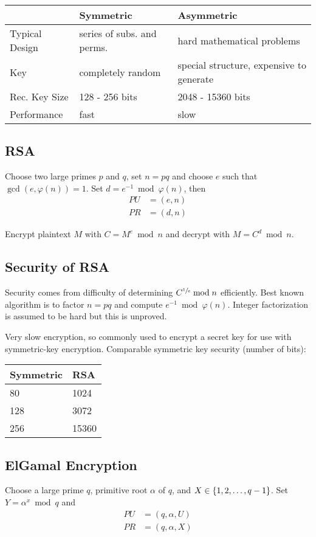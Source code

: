 \documentclass[draft]{article}
\begin{document}
\begin{tabular}{lll}
                   & Symmetric                  & Asymmetric                               \\\toprule
    Typical Design & series of subs. and perms. & hard mathematical problems               \\
    Key            & completely random          & special structure, expensive to generate \\
    Rec. Key Size  & 128 - 256 bits             & 2048 - 15360 bits                        \\
    Performance    & fast                       & slow                                     \\\bottomrule
\end{tabular}
\subsection{RSA}
Choose two large primes $p$ and $q$, set $n=pq$ and choose $e$ such that $\gcd(e, \varphi(n)) = 1$. Set $d=e^{-1}\bmod\varphi(n)$, then
\begin{align*}PU&=(e, n)\\PR&=(d, n)\end{align*}

Encrypt plaintext $M$ with $C=M^e \bmod{n}$ and decrypt with $M = C^d\bmod{n}$.

\subsection{Security of RSA}
Security comes from difficulty of determining $C^{\sfrac{1}{e}}\bmod{n}$ efficiently. Best known algorithm is to factor $n=pq$ and compute $e^{-1}\bmod{\varphi(n)}$. Integer factorization is assumed to be hard but this is unproved.

Very slow encryption, so commonly used to encrypt a secret key for use with symmetric-key encryption. Comparable symmetric key security (number of bits):

\begin{tabular}{ll}
    Symmetric & RSA   \\\toprule
    80        & 1024  \\
    128       & 3072  \\
    256       & 15360 \\\bottomrule
\end{tabular}

\subsection{ElGamal Encryption}
Choose a large prime $q$, primitive root $\alpha$ of $q$, and $X \in \left\lbrace1, 2, \hdots, q - 1\right\rbrace$. Set $Y = \alpha^x\bmod{q}$ and \begin{align*}PU&=(q,\alpha,U)\\PR&=(q,\alpha,X)\end{align*}
\end{document}
